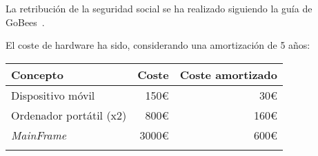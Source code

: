 La retribución de la seguridad social se ha realizado siguiendo la guía de GoBees~\cite{gobees}.

El coste de hardware ha sido, considerando una amortización de 5 años:

\begin{longtable}[]{@{}lrr@{}}
	\toprule
	\begin{minipage}[b]{0.29\columnwidth}\raggedright\strut
		\textbf{Concepto}\strut
	\end{minipage} & \begin{minipage}[b]{0.18\columnwidth}\raggedright\strut
		\textbf{Coste}\strut
	\end{minipage} & \begin{minipage}[b]{0.32\columnwidth}\raggedright\strut
		\textbf{Coste amortizado}\strut
	\end{minipage}\tabularnewline
	\midrule
	\endhead
	\begin{minipage}[t]{0.29\columnwidth}\raggedright\strut
		Dispositivo móvil\strut
	\end{minipage} & \begin{minipage}[t]{0.18\columnwidth}\raggedright\strut
		150\euro{}\strut
	\end{minipage} & \begin{minipage}[t]{0.32\columnwidth}\raggedright\strut
		30\euro{}\strut
	\end{minipage}\tabularnewline
	\begin{minipage}[t]{0.29\columnwidth}\raggedright\strut
		Ordenador portátil (x2)\strut
	\end{minipage} & \begin{minipage}[t]{0.18\columnwidth}\raggedright\strut
		800\euro{}\strut
	\end{minipage} & \begin{minipage}[t]{0.32\columnwidth}\raggedright\strut
		160\euro{}\strut
	\end{minipage}\tabularnewline
	\begin{minipage}[t]{0.29\columnwidth}\raggedright\strut
		\textit{MainFrame}\strut
	\end{minipage} & \begin{minipage}[t]{0.18\columnwidth}\raggedright\strut
		3000\euro{}\strut
	\end{minipage} & \begin{minipage}[t]{0.32\columnwidth}\raggedright\strut
		600\euro{}\strut
	\end{minipage}\tabularnewline
	\begin{minipage}[t]{0.29\columnwidth}\raggedright\strut

\end{minipage}
\end{longtable}
